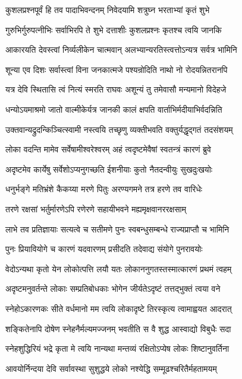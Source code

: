 \twolineshloka
{कुशलप्रश्नपूर्वं हि तव पादाभिवन्दनम्}
{निवेदयामि शत्रुघ्न भरताभ्यां कृतं शुभे}%

\twolineshloka
{गुरुभिर्गुरुपत्नीभिः सर्वाभिरपि ते शुभे}
{दत्ताशीः कुशलप्रश्नः कृतश्च त्वयि जानकि}%

\twolineshloka
{आकारयति देवस्त्वां निर्व्यलीकेन चात्मवान्}
{अलभ्यान्यरतिस्त्वत्तोऽन्यत्र सर्वत्र भामिनि}%

\twolineshloka
{शून्या एव दिशः सर्वास्त्वां विना जनकात्मजे}
{पश्यन्रोदिति नाथो नो रोदयन्नितरानपि}%

\twolineshloka
{यत्र देवि स्थितासि त्वं नित्यं स्मरति राघवः}
{अशून्यं तु तमेवासौ मन्यमानो विदेहजे}%

\twolineshloka
{धन्योऽयमाश्रमो जातो वाल्मीकेर्यत्र जानकी}
{कालं क्षपति वार्ताभिर्मदीयाभिर्वदन्निति}%

\twolineshloka
{उक्तवान्यद्रुदन्किञ्चित्स्वामी नस्त्वयि तच्छृणु}
{व्यक्तीभवति वक्तुर्यद्धृद्गतं तदसंशयम्}%

\twolineshloka
{लोका वदन्ति मामेव सर्वेषामीश्वरेश्वरम्}
{अहं त्वदृष्टमेवैषां स्वतन्त्रं कारणं ब्रुवे}%

\twolineshloka
{अदृष्टमेव कार्येषु सर्वेशोऽप्यनुगच्छति}
{ईशनीयाः कुतो नैतदन्वीयुः सुखदुःखयोः}%

\twolineshloka
{धनुर्भङ्गे मतिभ्रंशे कैकय्या मरणे पितुः}
{अरण्यगमने तत्र हरणे तव वारिधेः}%

\twolineshloka
{तरणे रक्षसां भर्तुर्मारणेऽपि रणेरणे}
{सहायीभवने मह्यमृक्षवानररक्षसाम्}%

\twolineshloka
{लाभे तव प्रतिज्ञायाः सत्यत्वे च सतीमणे}
{पुनः स्वबन्धुसम्बन्धे राज्यप्राप्तौ च भामिनि}%

\twolineshloka
{पुनः प्रियावियोगे च कारणं यदवारणम्}
{प्रसीदति तदेवाद्य संयोगे पुनरावयोः}%

\twolineshloka
{वेदोऽन्यथा कृतो येन लोकोत्पत्ति लयौ यतः}
{लोकाननुगतस्तस्मात्कारणं प्रथमं त्वहम्}%

\twolineshloka
{अदृष्टमनुवर्तन्ते लोकाः सम्प्रतिबोधकाः}
{भोगेन जीर्यतेऽदृष्टं तत्तद्भुक्तं त्वया वने}%

\twolineshloka
{स्नेहोऽकारणकः सीते वर्धमानो मम त्वयि}
{लोकादृष्टे तिरस्कृत्य त्वामाह्वयत आदरात्}%

\twolineshloka
{शङ्कितेनापि दोषेण स्नेहनैर्मल्यमज्जनम्}
{भवतीति स वै शुद्ध आस्वाद्यो विबुधैः सदा}%

\twolineshloka
{स्नेहशुद्धिरियं भद्रे कृता मे त्वयि नान्यथा}
{मन्तव्यं रक्षितोऽप्येष लोकः शिष्टानुवर्तिना}%

\twolineshloka
{आवयोर्निन्दया देवि सर्वावस्था सुशुद्धये}
{लोको नश्येद्धि सम्मूढश्चरितैर्महतामयम्}%

